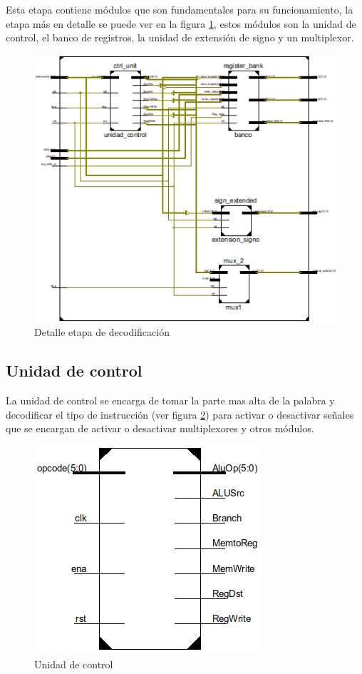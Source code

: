 Esta etapa contiene m\'odulos que son fundamentales para su funcionamiento, la etapa m\'as en detalle se puede ver en la figura \ref{fig:decodedetail}, estos m\'odulos son la unidad de control, el banco de registros, la unidad de extensi\'on de signo y un multiplexor.

\begin{figure}[H] 
\centering
\includegraphics[scale=0.7]{img/decode_stage_inside}
\caption{Detalle etapa de decodificaci\'on}
\label{fig:decodedetail}
\end{figure} 

\subsection{Unidad de control}
La unidad de control se encarga de tomar la parte mas alta de la palabra y decodificar el tipo de instrucci\'on (ver figura \ref{fig:ctrl_unit}) para activar o desactivar señales que se encargan de activar o desactivar multiplexores y otros m\'odulos.

\begin{figure}[H]
\centering
\includegraphics[scale=0.5]{img/unidad_control}
\caption{Unidad de control}
\label{fig:ctrl_unit}
\end{figure} 

